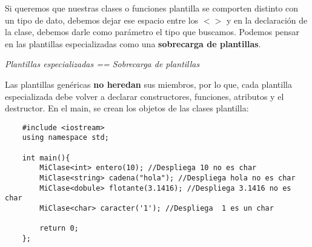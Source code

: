 Si queremos que nuestras clases o funciones plantilla se comporten distinto con un tipo de dato, debemos dejar ese espacio entre los $< >$ y en la declaración de la clase, debemos darle como parámetro el tipo que buscamos. Podemos pensar en las plantillas especializadas como una \textbf{sobrecarga de plantillas}.\begin{center}\textit{Plantillas especializadas == Sobrecarga de plantillas}\end{center}
Las plantillas genéricas \textbf{no heredan} sus miembros, por lo que, cada plantilla especializada debe volver a declarar constructores, funciones, atributos y el destructor. En el main, se crean los objetos de las clases plantilla:
\begin{lstlisting}
    #include <iostream>
    using namespace std;
    
    int main(){
        MiClase<int> entero(10); //Despliega 10 no es char
        MiClase<string> cadena("hola"); //Despliega hola no es char
        MiClase<dobule> flotante(3.1416); //Despliega 3.1416 no es char
        MiClase<char> caracter('1'); //Despliega  1 es un char
        
        return 0;
    };
\end{lstlisting}



